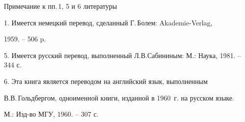 




\vskip 1cm





{\small Примечание к пп.\,1, 5 и 6 литературы





1. Имеется немецкий перевод, сделанный Г.\,Болем: Akademie-Verlag,


1959. -- 506 p.





5. Имеется русский перевод, выполненный Л.В.Сабининым: М.: Наука, 1981. -- 344 с.





6. Эта книга является переводом на английский язык, выполненным


В.В.\,Гольдбергом, одноименной книги, изданной в 1960~г. на русском языке.


М.: Изд-во МГУ, 1960. -- 307 с.}





\vskip 1cm









\smallskip






\smallskip









\label{end}





